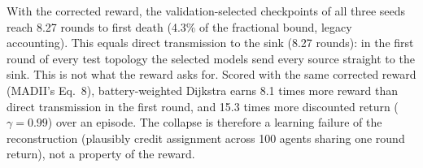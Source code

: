 With the corrected reward, the validation-selected checkpoints of all three seeds reach 8.27 rounds to first death (4.3\% of the fractional bound, legacy accounting). This equals direct transmission to the sink (8.27 rounds): in the first round of every test topology the selected models send every source straight to the sink. This is not what the reward asks for. Scored with the same corrected reward (MADII's Eq.~8), battery-weighted Dijkstra earns 8.1 times more reward than direct transmission in the first round, and 15.3 times more discounted return ($\gamma=0.99$) over an episode. The collapse is therefore a learning failure of the reconstruction (plausibly credit assignment across 100 agents sharing one round return), not a property of the reward.

